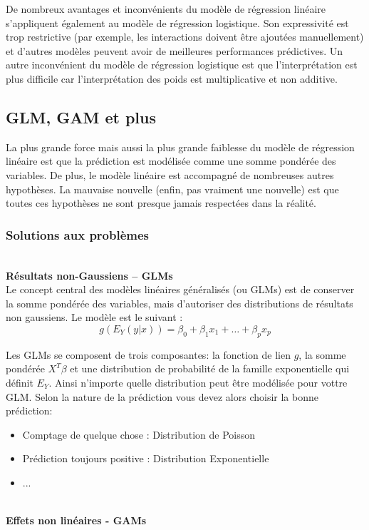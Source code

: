 De nombreux avantages et inconvénients du modèle de régression linéaire s'appliquent également au modèle de régression logistique. Son expressivité est trop restrictive (par exemple, les interactions doivent être ajoutées manuellement) et d'autres modèles peuvent avoir de meilleures performances prédictives. Un autre inconvénient du modèle de régression logistique est que l'interprétation est plus difficile car l'interprétation des poids est multiplicative et non additive.

\subsection{GLM, GAM et plus}

La plus grande force mais aussi la plus grande faiblesse du modèle de régression linéaire est que la prédiction est modélisée comme une somme pondérée des variables. De plus, le modèle linéaire est accompagné de nombreuses autres hypothèses. La mauvaise nouvelle (enfin, pas vraiment une nouvelle) est que toutes ces hypothèses ne sont presque jamais respectées dans la réalité. 

\subsubsection{Solutions aux problèmes}
\\
\textbf{Résultats non-Gaussiens – GLMs}
\\
Le concept central des modèles linéaires généralisés (ou GLMs) est de conserver la somme pondérée des variables, mais d'autoriser des distributions de résultats non gaussiens.
Le modèle est le suivant :
\[
g(E_Y(y|x))=\beta_0+\beta_1x_{1}+\ldots+\beta_px_{p}
\]

Les GLMs se composent de trois composantes: la fonction de lien \(g\), la somme pondérée \(X^T\beta\) et une distribution de probabilité de la famille exponentielle qui définit \(E_Y\).
Ainsi n'importe quelle distribution peut être modélisée pour vottre GLM. Selon la nature de la prédiction vous devez alors choisir la bonne prédiction:
\begin{itemize}
    \item Comptage de quelque chose : Distribution de Poisson
    \item Prédiction toujours positive : Distribution Exponentielle
    \item ...
\end{itemize}

\\
\textbf{Effets non linéaires - GAMs}
\\

